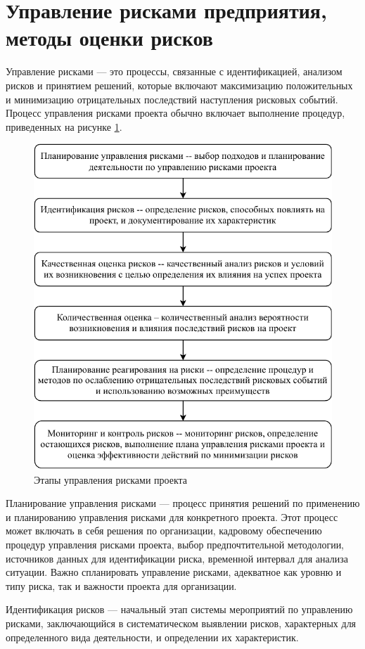 \section{Управление рисками предприятия, методы оценки рисков}

Управление рисками --- это процессы, связанные с идентификацией, анализом рисков и принятием решений, которые включают максимизацию положительных и минимизацию отрицательных последствий наступления рисковых событий. Процесс управления рисками проекта обычно включает выполнение процедур, приведенных на рисунке \ref{fig:diagram-page-2}.

\begin{figure}
	\centering
	\includegraphics[width=0.7\linewidth]{Diagram-Page-2}
	\caption{Этапы управления рисками проекта}
	\label{fig:diagram-page-2}
\end{figure}

Планирование управления рисками --- процесс принятия решений по применению и планированию управления рисками для конкретного проекта. Этот процесс
может включать в себя решения по организации, кадровому обеспечению процедур
управления рисками проекта, выбор предпочтительной методологии, источников данных
для идентификации риска, временной интервал для анализа ситуации. Важно
спланировать управление рисками, адекватное как уровню и типу риска, так и важности
проекта для организации.

Идентификация рисков --- начальный этап системы мероприятий по управлению рисками, заключающийся в систематическом выявлении рисков, характерных для определенного вида деятельности, и определении их характеристик.

